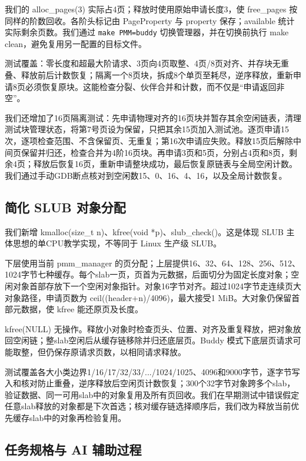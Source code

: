 \documentclass[UTF8,a4paper,10pt]{ctexart}
\begin{document}
我们的 alloc\_pages(3) 实际占4页；释放时使用原始申请长度3，使 free\_pages 按同样的阶数回收。各阶头标记由 PageProperty 与 property 保存；available 统计实际剩余页数。我们通过 \nolinkurl{make PMM=buddy} 切换管理器，并在切换前执行 make clean，避免复用另一配置的目标文件。


测试覆盖：零长度和超最大阶请求、3页向4页取整、4页/8页对齐、并存块无重叠、释放前后计数恢复；隔离一个8页块，拆成8个单页至耗尽，逆序释放，重新申请8页必须恢复原块。这能检查分裂、伙伴合并和计数，而不仅是“申请返回非空”。


我们还增加了16页隔离测试：先申请物理对齐的16页块并暂存其余空闲链表，清理测试块管理状态，将第7号页设为保留，只把其余15页加入测试池。逐页申请15次，逐项检查范围、不含保留页、无重复；第16次申请应失败。释放15页后解除中间页保留并归还，检查合并为4阶16页块。再申请3页和5页，分别占4页和8页，剩余4页；释放后恢复16页，重新申请整块成功，最后恢复原链表与全局空闲计数。我们通过手动GDB断点核对到空闲数15、0、16、4、16，以及全局计数恢复。


\subsection{简化 SLUB 对象分配}

我们新增 kmalloc(size\_t n)、kfree(void *p)、slub\_check()。这是体现 SLUB 主体思想的单CPU教学实现，不等同于 Linux 生产级 SLUB。


下层使用当前 pmm\_manager 的页分配；上层提供16、32、64、128、256、512、1024字节七种缓存。每个slab一页，页首为元数据，后面切分为固定长度对象；空闲对象首部存放下一个空闲对象指针。对象16字节对齐。超过1024字节走连续页大对象路径，申请页数为 ceil((header+n)/4096)，最大接受1 MiB。大对象仍保留首部元数据，使 kfree 能还原页及长度。


kfree(NULL) 无操作。释放小对象时检查页头、位置、对齐及重复释放，把对象放回空闲链；整slab空闲后从缓存链移除并归还底层页。Buddy 模式下底层页请求可能取整，但仍保存原请求页数，以相同请求释放。


测试覆盖各大小类边界1/16/17/32/33/.../1024/1025、4096和9000字节，逐字节写入和核对防止重叠，逆序释放后空闲页计数恢复；300个32字节对象跨多个slab，验证数据、同一可用slab中的对象复用及所有页回收。我们在早期测试中错误假定任意slab释放的对象都是下次首选；核对缓存链选择顺序后，我们改为释放当前优先缓存slab中的对象再检验复用。


\subsection{任务规格与 AI 辅助过程}
\end{document}
